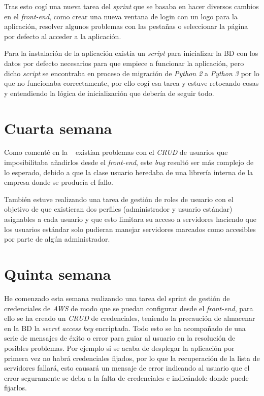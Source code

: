 Tras esto cogí una nueva tarea del \textit{sprint} que se basaba en hacer diversos cambios en el \textit{front-end}, como crear una nueva ventana de login con un logo para la aplicación, resolver algunos problemas con las pestañas o seleccionar la página por defecto al acceder a la aplicación.

Para la instalación de la aplicación existía un \textit{script} para inicializar la BD con los datos por defecto necesarios para que empiece a funcionar la aplicación, pero dicho \textit{script} se encontraba en proceso de migración de \textit{Python 2} a \textit{Python 3} por lo que no funcionaba correctamente, por ello cogí esa tarea y estuve retocando cosas y entendiendo la lógica de inicialización que debería de seguir todo.

\section{Cuarta semana}

Como comenté en la ~ existían problemas con el \textit{CRUD} de usuarios que imposibilitaba añadirlos desde el \textit{front-end}, este \textit{bug} resultó ser más complejo de lo esperado, debido a que la clase usuario heredaba de una librería interna de la empresa donde se producía el fallo. 

También estuve realizando una tarea de gestión de roles de usuario con el objetivo de que existieran dos perfiles (administrador y usuario estándar) asignables a cada usuario y que esto limitara su acceso a servidores haciendo que los usuarios estándar solo pudieran manejar servidores marcados como accesibles por parte de algún administrador.

\section{Quinta semana}

He comenzado esta semana realizando una tarea del sprint de gestión de credenciales de \textit{AWS} de modo que se puedan configurar desde el \textit{front-end}, para ello se ha creado un \textit{CRUD} de credenciales, teniendo la precaución de almacenar en la BD la \textit{secret access key} encriptada. Todo esto se ha acompañado de una serie de mensajes de éxito o error para guiar al usuario en la resolución de posibles problemas. Por ejemplo si se acaba de desplegar la aplicación por primera vez no habrá credenciales fijados, por lo que la recuperación de la lista de servidores fallará, esto causará un mensaje de error indicando al usuario que el error seguramente se deba a la falta de credenciales e indicándole donde puede fijarlos.

